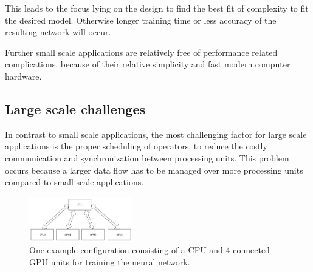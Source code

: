 \documentclass[conference]{IEEEtran}
\begin{document}
This leads to the focus lying on the design to find the best fit of complexity to fit the desired model. Otherwise longer training time or less accuracy of the resulting network will occur.

Further small scale applications are relatively free of performance related complications, because of their relative simplicity and fast modern computer hardware.

\subsection{Large scale challenges}
In contrast to small scale applications, the most challenging factor for large scale applications is the proper scheduling of operators, to reduce the costly communication and synchronization between processing units. This problem occurs because a larger data flow has to be managed over more processing units compared to small scale applications.

\begin{figure}
\centering
\includegraphics[width=0.4\textwidth]{example_configuration.png}
\caption{One example configuration consisting of a CPU and 4 connected GPU units for training the neural network.}
\end{figure}
\end{document}

